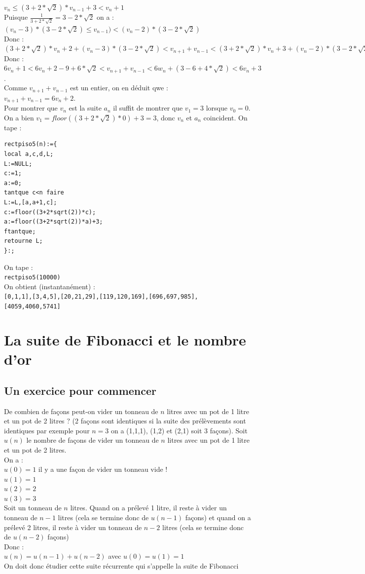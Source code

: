 \documentclass[a4paper,11pt]{book}
\begin{document}
\begin{enumerate}
$v_n\leq (3+2*\sqrt 2)*v_{n-1}+3<v_n+1$\\
Puisque $\displaystyle \frac{1}{3+2*\sqrt 2}=3-2*\sqrt 2$ on a :\\
$(v_n-3)*(3-2*\sqrt 2)\leq v_{n-1})<(v_n-2)*(3-2*\sqrt 2)$\\
Donc :\\
$(3+2*\sqrt 2)*v_n+2+(v_n-3)*(3-2*\sqrt 2)<v_{n+1}+v_{n-1}<(3+2*\sqrt 2)*v_n+3+(v_n-2)*(3-2*\sqrt 2)$\\
Donc :\\
$6v_n+1<6v_n+2-9+6*\sqrt 2<v_{n+1}+v_{n-1}<6w_n+(3-6+4*\sqrt 2)<6v_n+3$.\\
Comme $v_{n+1}+v_{n-1}$ est un entier, on en d\'eduit qwe :\\
 $v_{n+1}+v_{n-1}=6v_n+2$.\\
Pour montrer que $v_n$ est la suite $a_n$ il suffit de montrer que $v_1=3$ 
lorsque $v_0=0$.\\
On a bien $v_1=floor((3+2*\sqrt 2)*0)+3=3$, donc $v_n$ et $a_n$ coincident.
On tape :
\begin{verbatim}
rectpiso5(n):={
local a,c,d,L;
L:=NULL;
c:=1;
a:=0;
tantque c<n faire
L:=L,[a,a+1,c];
c:=floor((3+2*sqrt(2))*c);
a:=floor((3+2*sqrt(2))*a)+3;
ftantque;
retourne L;
}:;
\end{verbatim}
On tape :\\
{\tt rectpiso5(10000)}\\
On obtient (instantan\'ement) :\\
{\tt [0,1,1],[3,4,5],[20,21,29],[119,120,169],[696,697,985], [4059,4060,5741]}
\end{enumerate}


\chapter{La suite de Fibonacci et le nombre d'or}
\section{Un exercice pour commencer}
De combien de fa\c{c}ons peut-on vider un tonneau de $n$ litres avec un pot de 
1 litre et un pot de 2 litres ? (2 fa\c{c}ons sont identiques si la suite des 
pr\'el\`evements sont identiques par exemple pour $n=3$ on a (1,1,1), (1,2) et 
(2,1) soit 3 fa\c{c}ons).
Soit $u(n)$ le nombre de fa\c{c}ons de vider un tonneau de $n$ litres avec un 
pot de 1 litre et un pot de 2 litres.\\
On a :\\
$u(0)=1$ il y a une  fa\c{c}on de vider un tonneau vide !\\
$u(1)=1$\\
$u(2)=2$\\
$u(3)=3$\\
Soit un tonneau de $n$ litres. Quand on a pr\'elev\'e 1 litre, il reste \`a 
vider un tonneau de $n-1$ litres (cela se termine donc de $u(n-1)$ fa\c{c}ons)
 et quand on a pr\'elev\'e 2 litres, il reste \`a vider un tonneau de $n-2$ 
litres (cela se termine donc de $u(n-2)$ fa\c{c}ons)\\
 Donc :\\
$u(n)=u(n-1)+u(n-2)$ avec $u(0)=u(1)=1$\\
On doit donc \'etudier cette suite r\'ecurrente qui s'appelle la suite de 
Fibonacci
\end{document}
